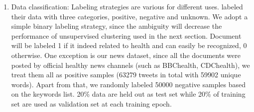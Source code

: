 \begin{enumerate}
    \item Data classification: Labeling strategies are various for different uses. \cite{lampos2010flu} labeled their data with three categories, positive, negative and unknown. We adopt a simple binary labeling strategy, since the ambiguity will decrease the performance of unsupervised clustering used in the next section. Document will be labeled 1 if it indeed related to health and can easily be recognized, 0 otherwise. One exception is our news dataset, since all the documents were posted by official healthy news channels (such as BBChealth, CDChealth), we treat them all as positive samples (63279 tweets in total with 59902 unique words). Apart from that, we randomly labeled 50000 negative samples based on the keywords list. 20\% data are held out as test set while 20\% of training set are used as validation set at each training epoch.

\end{enumerate}
